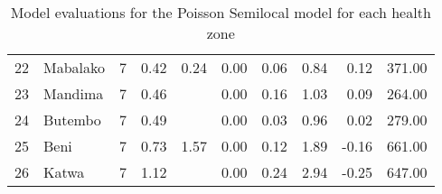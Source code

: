 \begin{table}[ht]
\begin{tabular}{rlrrrrrrrr}
  22 & Mabalako &   7 & 0.42 & 0.24 & 0.00 & 0.06 & 0.84 & 0.12 & 371.00 \\ 
  23 & Mandima &   7 & 0.46 &  & 0.00 & 0.16 & 1.03 & 0.09 & 264.00 \\ 
  24 & Butembo &   7 & 0.49 &  & 0.00 & 0.03 & 0.96 & 0.02 & 279.00 \\ 
  25 & Beni &   7 & 0.73 & 1.57 & 0.00 & 0.12 & 1.89 & -0.16 & 661.00 \\ 
  26 & Katwa &   7 & 1.12 &  & 0.00 & 0.24 & 2.94 & -0.25 & 647.00 \\ 
   \hline
\end{tabular}
\caption{Model evaluations for the Poisson Semilocal model for each health zone} 
\label{tab:by_hz_evo}
\end{table}
